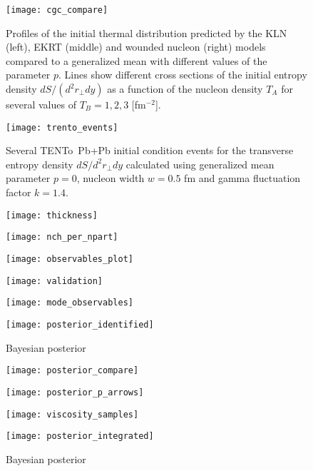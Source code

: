 \documentclass[aps,prc,reprint,amsmath]{revtex4-1}
\newcommand{\trento}{T\raisebox{-0.5ex}{R}ENTo}
\begin{document}
\begin{figure*}
    \texttt{[image: cgc\_compare]}
    \caption{Profiles of the initial thermal distribution predicted by the KLN (left), EKRT (middle) and wounded nucleon (right) models compared to a generalized mean with different values of the parameter $p$. Lines show different cross sections of the initial entropy density $dS/(d^2r_\perp dy)$ as a function of the nucleon density $T_A$ for several values of $T_B = 1, 2, 3$ [fm$^{-2}$].} 
\end{figure*}

\begin{figure}
    \texttt{[image: trento\_events]}
    \caption{Several \protect\trento\ Pb+Pb initial condition events for the transverse entropy density $dS/d^2r_\perp dy$ calculated using generalized mean parameter $p=0$, nucleon width $w=0.5$ fm and gamma fluctuation factor $k=1.4$.}
\end{figure}

\begin{figure}[b]
    \texttt{[image: thickness]}
\end{figure}

\begin{figure}
    \texttt{[image: nch\_per\_npart]}
\end{figure}

\begin{figure*}
    \texttt{[image: observables\_plot]}
\end{figure*}

\begin{figure*}
    \texttt{[image: validation]}
\end{figure*}

\begin{figure*}
    \texttt{[image: mode\_observables]}
\end{figure*}

\begin{figure*}
    \texttt{[image: posterior\_identified]}
    \caption{Bayesian posterior}
\end{figure*}

\begin{figure*}
    \texttt{[image: posterior\_compare]}
\end{figure*}

\begin{figure}
    \centering
    \texttt{[image: posterior\_p\_arrows]}
\end{figure}

\begin{figure}
    \texttt{[image: viscosity\_samples]}
\end{figure}

\appendix
\begin{figure*}
    \texttt{[image: posterior\_integrated]}
    \caption{Bayesian posterior}
\end{figure*}


\end{document}
